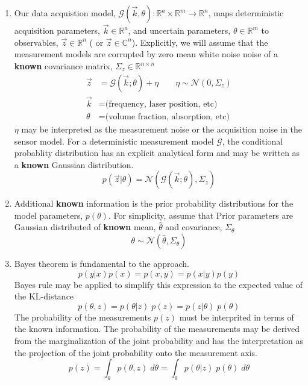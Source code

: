 \documentclass{article}         %
\theoremstyle{definition}
\theoremstyle{remark}
\begin{document}
\begin{enumerate}
  \item Our data acquistion model, $\mathcal{G}(\vec{k},\theta): \mathbb{R}^a
\times \mathbb{R}^m \rightarrow \mathbb{R}^n $,
maps deterministic acquisition
parameters, $\vec{k} \in \mathbb{R}^a$, and uncertain parameters, $\theta \in \mathbb{R}^m$
to observables, $\vec{z} \in \mathbb{R}^n$ ( or $\vec{z} \in \mathbb{C}^n$).
Explicitly, we will assume that the
measurement models are corrupted by zero mean white noise noise of a
\textbf{known} covariance matrix, $\Sigma_z \in \mathbb{R}^{n \times n}$ 
\begin{equation}
\label{sensormodelstructure}
\begin{split}
  \vec{z} & = \mathcal{G}(\vec{k};\theta) + \eta   \qquad   \eta \sim \mathcal{N}(0,\Sigma_z)
      \\
  \vec{k} & =  \text{(frequency, laser position, etc)}
      \\
  \theta &  =  \text{(volume fraction, absorption, etc)}
     \end{split}
\end{equation}
$\eta$ may be interpreted as the measurement noise or the acquisition noise
in the sensor model. For a deterministic measurement model $\mathcal{G}$,
the conditional probablity distribution has an explicit analytical form
and may be written as a  \textbf{known} Gaussian
distribution. 
  \[ 
      p(\vec{z}|\theta)   =  \mathcal{N}(\mathcal{G}(\vec{k};\theta),\Sigma_z)  
  \]
  \item Additional \textbf{known} information is the prior probability
distributions for the model parameters, $p(\theta)$.  For simplicity,
    assume that Prior parameters are Gaussian distributed of 
   \textbf{known} mean, $\hat{\theta}$ and covariance, $\Sigma_\theta$
   \[
      \theta \sim \mathcal{N} (\hat{\theta}, \Sigma_\theta)
   \]
  \item Bayes theorem is fundamental to the approach.
\[
p(y|x) p(x) = p(x,y) = p(x|y) p(y)
\]
Bayes rule may be applied to simplify this expression
to the expected value of the KL-distance
\[
p(\theta,z) = p(\theta|z) \; p(z)
            = p(z|\theta) \; p(\theta)
\]
The probability of the measurements $p(z)$ must be interprited in terms of the
known information. The probability of the measurements may be derived from
the marginalization of the joint probability and has the interpretation as
the projection of the joint probability onto the measurement axis.
\[
  p(z) = \int_\theta p(\theta,z)  \; d\theta 
       = \int_\theta p(\theta|z) \; p(\theta)\; d\theta 
\]
\end{enumerate}
\end{document}
